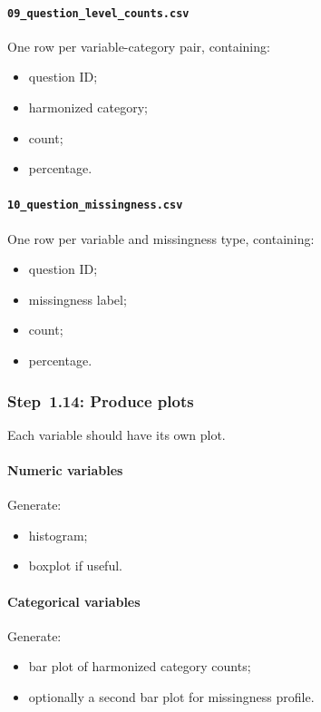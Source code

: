 \paragraph{\texttt{09\_question\_level\_counts.csv}}
One row per variable-category pair, containing:
\begin{itemize}
    \item question ID;
    \item harmonized category;
    \item count;
    \item percentage.
\end{itemize}

\paragraph{\texttt{10\_question\_missingness.csv}}
One row per variable and missingness type, containing:
\begin{itemize}
    \item question ID;
    \item missingness label;
    \item count;
    \item percentage.
\end{itemize}

\subsubsection{Step~1.14: Produce plots}
Each variable should have its own plot.

\paragraph{Numeric variables}
Generate:
\begin{itemize}
    \item histogram;
    \item boxplot if useful.
\end{itemize}

\paragraph{Categorical variables}
Generate:
\begin{itemize}
    \item bar plot of harmonized category counts;
    \item optionally a second bar plot for missingness profile.
\end{itemize}

